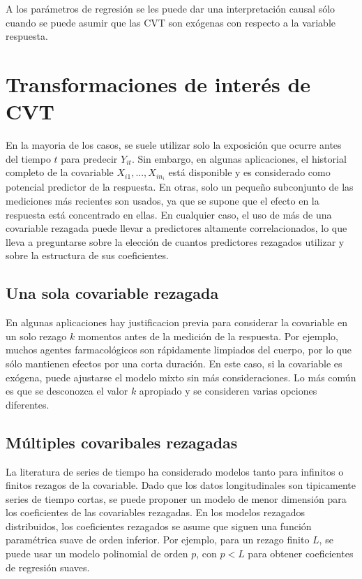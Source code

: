 \documentclass[spanish]{article}
\numberwithin{figure}{subsection}
\numberwithin{equation}{subsection}
\numberwithin{table}{subsection}
\def\xseqn{$X_{i1}, ..., X_{in_i}$}
\begin{document}
A los parámetros de regresión se les puede dar una interpretación causal sólo
cuando se puede asumir que las CVT son exógenas con respecto a la variable
respuesta.

\section{Transformaciones de interés de CVT}

En la mayoria de los casos, se suele utilizar solo la exposición que ocurre
antes del tiempo $t$ para predecir $Y_{it}$. Sin embargo, en algunas
aplicaciones, el historial completo de la covariable \xseqn{} está disponible y
es considerado como potencial predictor de la respuesta. En otras, solo un
pequeño subconjunto de las mediciones más recientes son usados, ya que se
supone que el efecto en la respuesta está concentrado en ellas. En cualquier
caso, el uso de más de una covariable rezagada puede llevar a predictores
altamente correlacionados, lo que lleva a preguntarse sobre la elección de
cuantos predictores rezagados utilizar y sobre la estructura de sus
coeficientes.


\subsection{Una sola covariable rezagada}

En algunas aplicaciones hay justificacion previa para considerar la covariable
en un solo rezago $k$ momentos antes de la medición de la respuesta. Por
ejemplo, muchos agentes farmacológicos son rápidamente limpiados del cuerpo,
por lo que sólo mantienen efectos por una corta duración. En este caso, si la
covariable es exógena, puede ajustarse el modelo mixto sin más consideraciones.
Lo más común es que se desconozca el valor $k$ apropiado y se consideren varias
opciones diferentes.

\subsection{Múltiples covaribales rezagadas}

La literatura de series de tiempo ha considerado modelos tanto para infinitos o
finitos rezagos de la covariable. Dado que los datos longitudinales son
tipicamente series de tiempo cortas, se puede proponer un modelo de menor
dimensión para los coeficientes de las covariables rezagadas. En los modelos
rezagados distribuidos, los coeficientes rezagados se asume que siguen una
función paramétrica suave de orden inferior. Por ejemplo, para un rezago finito
$L$, se puede usar un modelo polinomial de orden $p$, con $p < L$ para obtener
coeficientes de regresión suaves.
\end{document}
